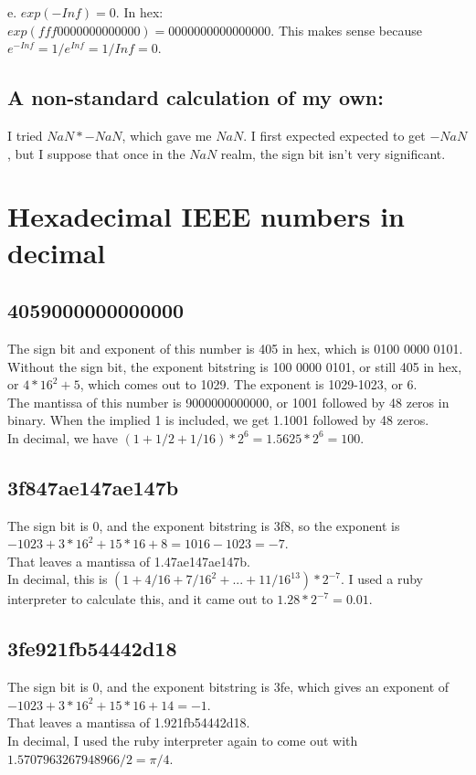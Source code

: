 \documentclass[11pt]{modart}
\begin{document}
e. $exp(-Inf) = 0$.  In hex:\\
$exp(fff0000000000000) = 0000000000000000$.  This makes sense because $e^{-Inf} = 1/e^{Inf} = 1/Inf = 0$.

\subsection{A non-standard calculation of my own:}
I tried $NaN*-NaN$, which gave me $NaN$.  I first expected expected to get  $-NaN$, but I suppose that once in the $NaN$ realm, the sign bit isn't very significant.

\section{Hexadecimal IEEE numbers in decimal}
\subsection{4059000000000000}
The sign bit and exponent of this number is 405 in hex, which is 0100 0000 0101.  Without the sign bit, the exponent bitstring is 100 0000 0101, or still 405 in hex, or $4*16^2 + 5$, which comes out to 1029.  The exponent is 1029-1023, or 6.\\
The mantissa of this number is 9000000000000, or 1001 followed by 48 zeros in binary.  When the implied 1 is included, we get 1.1001 followed by 48 zeros.\\
In decimal, we have $(1 + 1/2 + 1/16) * 2^6=1.5625*2^6=100$.
\subsection{3f847ae147ae147b}
The sign bit is 0, and the exponent bitstring is 3f8, so the exponent is $-1023 + 3*16^2 + 15*16 + 8=1016-1023 = -7$.\\
That leaves a mantissa of 1.47ae147ae147b. \\
In decimal, this is $(1 + 4/16 + 7/16^2 + ... + 11/16^{13})*2^{-7}$.  I used a ruby interpreter to calculate this,
and it came out to $1.28*2^{-7} = 0.01$.
\subsection{3fe921fb54442d18}
The sign bit is 0, and the exponent bitstring is 3fe, which gives an exponent of $-1023 + 3*16^2 + 15*16 + 14 = -1$.\\
That leaves a mantissa of 1.921fb54442d18.\\
In decimal, I used the ruby interpreter again to come out with $1.5707963267948966/2=\pi/4$.
\end{document}
